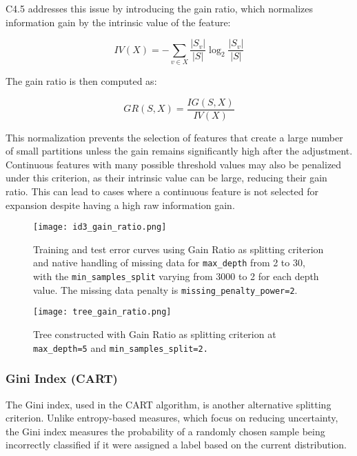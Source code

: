 \documentclass[12pt]{article}
\begin{document}
C4.5 addresses this issue by introducing the gain ratio, which normalizes information gain by the intrinsic value of the feature:

\begin{equation}
    IV(X) = - \sum_{v \in X} \frac{|S_v|}{|S|} \log_2 \frac{|S_v|}{|S|}
\end{equation}

The gain ratio is then computed as:

\begin{equation}
    GR(S, X) = \frac{IG(S, X)}{IV(X)}
\end{equation}

This normalization prevents the selection of features that create a large number of small partitions unless the gain remains significantly high after the adjustment. Continuous features with many possible threshold values may also be penalized under this criterion, as their intrinsic value can be large, reducing their gain ratio. This can lead to cases where a continuous feature is not selected for expansion despite having a high raw information gain.

\begin{figure}[H]
    \centering
    \texttt{[image: id3\_gain\_ratio.png]}
    \caption{Training and test error curves using Gain Ratio as splitting criterion and native handling of missing data for \texttt{max\_depth} from 2 to 30, with the \texttt{min\_samples\_split} varying from 3000 to 2 for each depth value. The missing data penalty is  \texttt{missing\_penalty\_power=2}.}
    \label{fig:enter-label}
\end{figure}

\begin{figure}[H]
    \centering
    \texttt{[image: tree\_gain\_ratio.png]}
    \caption{Tree constructed with Gain Ratio as splitting criterion at \texttt{max\_depth=5} and \texttt{min\_samples\_split=2.}}
    \label{fig:enter-label}
\end{figure}

\subsubsection{Gini Index (CART)}
The Gini index, used in the CART algorithm, is another alternative splitting criterion. Unlike entropy-based measures, which focus on reducing uncertainty, the Gini index measures the probability of a randomly chosen sample being incorrectly classified if it were assigned a label based on the current distribution.
\end{document}
